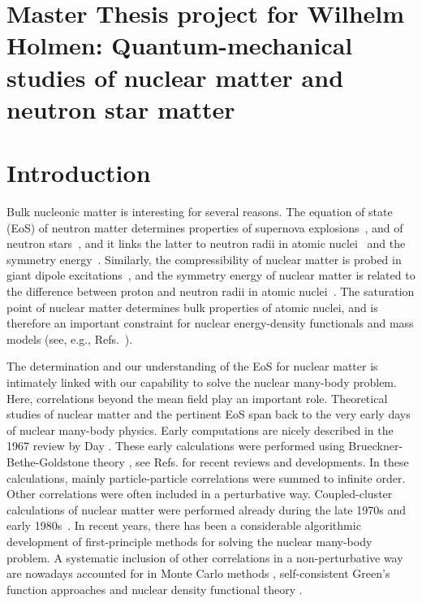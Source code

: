 \documentclass[aps,prc,twocolumn,showpacs,floatfix,nofootinbib,preprintnumbers,superscriptaddress,amsmath,amssymb]{revtex4-1}
\begin{document}
\pagestyle{plain}

\section*{Master Thesis project for Wilhelm Holmen: Quantum-mechanical studies of nuclear matter and neutron star matter}


\section{Introduction}

Bulk nucleonic matter is interesting for several reasons. The equation of state (EoS) of
neutron matter determines properties of supernova
explosions~\cite{burrows2013}, and of neutron
stars~\cite{weber1999,hh2000,lattimer2007,sammarruca2010,lattimer2012,hebeler2012f},
and it links the latter to neutron radii in atomic
nuclei~\cite{brown2000,horowitz2001,gandolfi2012} and the symmetry
energy~\cite{tsang2012,steiner2012}. Similarly, the compressibility of
nuclear matter is probed in giant dipole
excitations~\cite{shlomo1993}, and the symmetry energy of nuclear
matter is related to the difference between proton and neutron radii
in atomic nuclei~\cite{abrahamyan2012,reinhard2013,erler2013}. The
saturation point of nuclear matter determines bulk properties of
atomic nuclei, and is therefore an important constraint for nuclear
energy-density functionals and mass models (see,
e.g., Refs.~\cite{kortelainen2010,lunney2003}).

The determination and our understanding of the EoS for nuclear matter
is intimately linked with our capability to solve the nuclear
many-body problem. Here, correlations beyond the mean field play an
important role.  Theoretical studies of nuclear matter and the
pertinent EoS span back to the very early days of nuclear many-body
physics. Early computations are nicely described in the 1967 review by
Day \cite{day1967}. These early calculations were performed using
Brueckner-Bethe-Goldstone theory \cite{brueckner1954,brueckner1955},
see Refs.\cite{hh2000,baldo2012,baldo2012a,baardsen2014} for recent reviews and
developments.  In these calculations, mainly particle-particle
correlations were summed to infinite order.  Other correlations were
often included in a perturbative way. Coupled-cluster calculations of
nuclear matter were performed already during the late 1970s and early
1980s~\cite{kummel1978,day1981}. In recent years, there has been a
considerable algorithmic development of first-principle methods for
solving the nuclear many-body problem. A systematic inclusion of other
correlations in a non-perturbative way are nowadays accounted for in
Monte Carlo methods
\cite{carlson2003,gandolfi2009,gezerlis2010,lovato2012,gezerlis2013},
self-consistent Green's function approaches
\cite{dickhoff2004,soma2008, soma2012, baldo2012a,carbone2013} and
nuclear density functional theory \cite{lunney2003,erler2013}.
\end{document}

